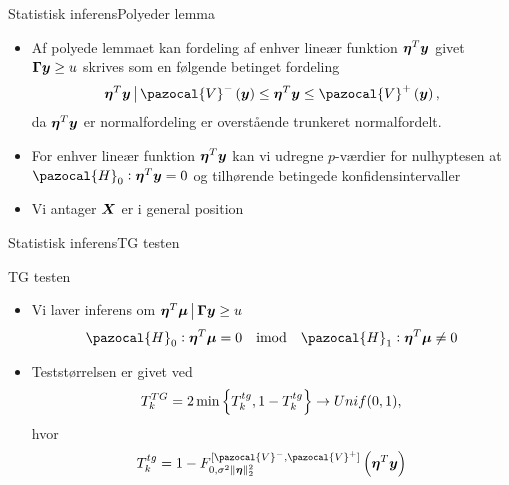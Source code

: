 \begin{frame}{Statistisk inferens}{Polyeder lemma}
\begin{itemize}
\item Af polyede lemmaet kan fordeling af enhver lineær funktion $\boldsymbol \eta^T \bm{y}$ givet $\boldsymbol \Gamma \bm{y} \geq u$ skrives som en følgende betinget fordeling
\begin{align*}
\boldsymbol \eta^T \vy \given \pazocal{V}^- \del{\vy} \leq \boldsymbol \eta^T \vy \leq \pazocal{V}^+ \del{\vy}, 
\end{align*}
da $\boldsymbol \eta^T \bm{y} $ er normalfordeling er overstående trunkeret normalfordelt. 
\item For enhver lineær funktion $\boldsymbol \eta^T \bm{y} $ kan vi udregne $p$-værdier for nulhyptesen at $\pazocal{H}_0:\boldsymbol \eta^T \vy   = 0$ og tilhørende betingede konfidensintervaller
\item Vi antager $\bm{X}$ er i general position
\end{itemize}
\end{frame}

\begin{frame}{Statistisk inferens}{TG testen}
\begin{block}{TG testen}
\begin{itemize}
\item Vi laver inferens om $ \boldsymbol \eta^T \bm{\mu} \,\big\vert\, \boldsymbol \Gamma \bm{y} \geq u $
\begin{align*}
 \pazocal{H}_0 : \boldsymbol \eta^T \vmu = 0 \quad \text{imod} \quad  \pazocal{H}_1 : \boldsymbol \eta^T \vmu  \neq 0
\end{align*}
\item Teststørrelsen er givet ved
\begin{align*}
T_k^{TG} = 2 \min \cbr{T_k^{tg}, 1 - T_k^{tg} }  \rightarrow Unif(0,1),
\end{align*}
hvor 
\begin{align*}
T_k^{tg} = 1 - F_{0, \sigma^2 \Vert \boldsymbol \eta \Vert^2_2}^{[\pazocal{V}^-, \pazocal{V}^+ ]} \del{\boldsymbol \eta^T \vy}
\end{align*}
\end{itemize}
\end{block}
\end{frame}

